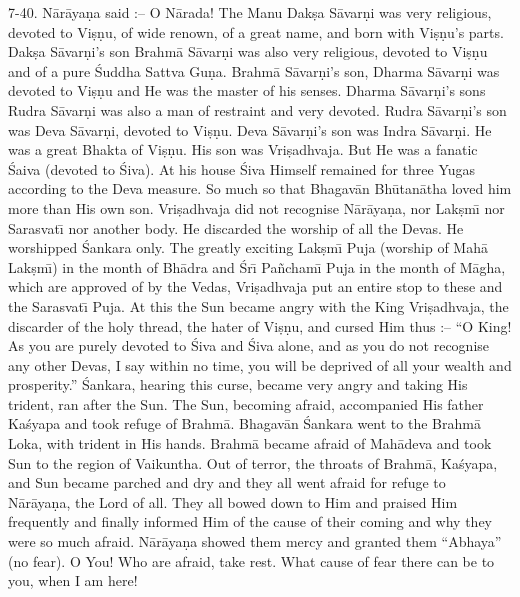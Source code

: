 7-40. N\=ar\=aya\d{n}a said :-- O N\=arada! The Manu Dak\d{s}a S\=avar\d{n}i was very religious, devoted to Vi\d{s}\d{n}u, of wide renown, of a great name, and born with Vi\d{s}\d{n}u's parts. Dak\d{s}a S\=avar\d{n}i's son Brahm\=a S\=avar\d{n}i was also very religious, devoted to Vi\d{s}\d{n}u and of a pure \'Suddha Sattva Gu\d{n}a. Brahm\=a S\=avar\d{n}i's son, Dharma S\=avar\d{n}i was devoted to Vi\d{s}\d{n}u and He was the master of his senses. Dharma S\=avar\d{n}i's sons Rudra S\=avar\d{n}i was also a man of restraint and very devoted. Rudra S\=avar\d{n}i's son was Deva S\=avar\d{n}i, devoted to Vi\d{s}\d{n}u. Deva S\=avar\d{n}i's son was Indra S\=avar\d{n}i. He was a great Bhakta of Vi\d{s}\d{n}u. His son was Vri\d{s}adhvaja. But He was a fanatic \'Saiva (devoted to \'Siva). At his house \'Siva Himself remained for three Yugas according to the Deva measure. So much so that Bhagav\=an Bh\=utan\=atha loved him more than His own son. Vri\d{s}adhvaja did not recognise N\=ar\=aya\d{n}a, nor Lak\d{s}m\={\i} nor Sarasvat\={\i} nor another body. He discarded the worship of all the Devas. He worshipped \'Sankara only. The greatly exciting Lak\d{s}m\={\i} Puja (worship of Mah\=a Lak\d{s}m\={\i}) in the month of Bh\=adra and \'Sr\={\i} Pa\~ncham\={\i} Puja in the month of M\=agha, which are approved of by the Vedas, Vri\d{s}adhvaja put an entire stop to these and the Sarasvat\={\i} Puja. At this the Sun became angry with the King Vri\d{s}adhvaja, the discarder of the holy thread, the hater of Vi\d{s}\d{n}u, and cursed Him thus :-- ``O King! As you are purely devoted to \'Siva and \'Siva alone, and as you do not recognise any other Devas, I say within no time, you will be deprived of all your wealth and prosperity.'' \'Sankara, hearing this curse, became very angry and taking His trident, ran after the Sun. The Sun, becoming afraid, accompanied His father Ka\'syapa and took refuge of Brahm\=a. Bhagav\=an \'Sankara went to the Brahm\=a Loka, with trident in His hands. Brahm\=a became afraid of Mah\=adeva and took Sun to the region of Vaikuntha. Out of terror, the throats of Brahm\=a, Ka\'syapa, and Sun became parched and dry and they all went afraid for refuge to N\=ar\=aya\d{n}a, the Lord of all. They all bowed down to Him and praised Him frequently and finally informed Him of the cause of their coming and why they were so much afraid. N\=ar\=aya\d{n}a showed them mercy and granted them ``Abhaya'' (no fear). O You! Who are afraid, take rest. What cause of fear there can be to you, when I am here!

